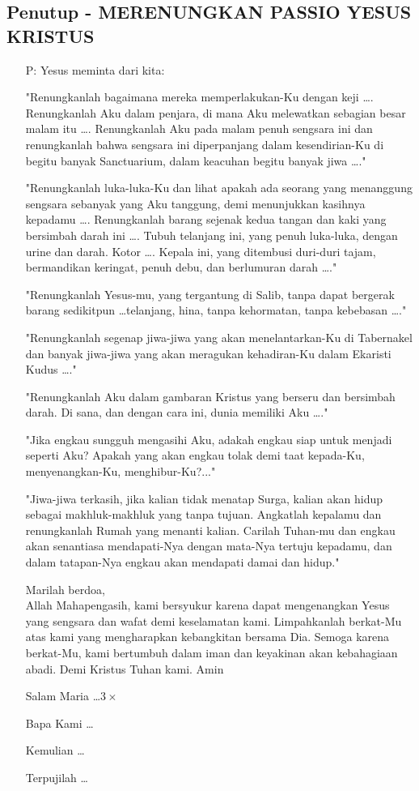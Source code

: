 \documentclass[a5paper,headsepline,titlepage,11pt,nnormalheadings,DIVcalc]{scrbook}
\newcommand{\BP}[1]{\begin{itemize} \item[P:] #1 \end{itemize}}
\begin{document}
\subsection*{Penutup - MERENUNGKAN PASSIO YESUS KRISTUS}

\BP{
Yesus meminta dari kita:

"Renungkanlah bagaimana mereka memperlakukan-Ku dengan keji \dots . Renungkanlah Aku dalam penjara, di mana Aku melewatkan sebagian besar malam itu \dots . Renungkanlah Aku pada malam penuh sengsara ini dan renungkanlah bahwa sengsara ini diperpanjang dalam kesendirian-Ku di begitu banyak Sanctuarium, dalam keacuhan begitu banyak jiwa \dots ."

"Renungkanlah luka-luka-Ku dan lihat apakah ada seorang yang menanggung sengsara sebanyak yang Aku tanggung, demi menunjukkan kasihnya kepadamu \dots . Renungkanlah barang sejenak kedua tangan dan kaki yang bersimbah darah ini \dots . Tubuh telanjang ini, yang penuh luka-luka, dengan urine dan darah. Kotor \dots . Kepala ini, yang ditembusi duri-duri tajam, bermandikan keringat, penuh debu, dan berlumuran darah \dots ."  

"Renungkanlah Yesus-mu, yang tergantung di Salib, tanpa dapat bergerak barang sedikitpun \dots  telanjang, hina, tanpa kehormatan, tanpa kebebasan \dots ."

"Renungkanlah segenap jiwa-jiwa yang akan menelantarkan-Ku di Tabernakel dan banyak jiwa-jiwa yang akan meragukan kehadiran-Ku dalam Ekaristi Kudus \dots ."

"Renungkanlah Aku dalam gambaran Kristus yang berseru dan bersimbah darah. Di sana, dan dengan cara ini, dunia memiliki Aku \dots ."

"Jika engkau sungguh mengasihi Aku, adakah engkau siap untuk menjadi seperti Aku? Apakah yang akan engkau tolak demi taat kepada-Ku, menyenangkan-Ku, menghibur-Ku?..."

"Jiwa-jiwa terkasih, jika kalian tidak menatap Surga, kalian akan hidup sebagai makhluk-makhluk yang tanpa tujuan. Angkatlah kepalamu dan renungkanlah Rumah yang menanti kalian. Carilah Tuhan-mu dan engkau akan senantiasa mendapati-Nya dengan mata-Nya tertuju kepadamu, dan dalam tatapan-Nya engkau akan mendapati damai dan hidup."

	Marilah berdoa,\\
	Allah Mahapengasih, kami bersyukur karena dapat mengenangkan Yesus yang sengsara dan wafat demi keselamatan kami. Limpahkanlah berkat-Mu atas kami yang mengharapkan kebangkitan bersama Dia. Semoga karena berkat-Mu, kami bertumbuh dalam iman dan keyakinan akan kebahagiaan abadi. Demi Kristus Tuhan kami. Amin

Salam Maria \dots $3\times$

Bapa Kami \dots 

Kemulian \dots

Terpujilah \dots
}
\end{document}
